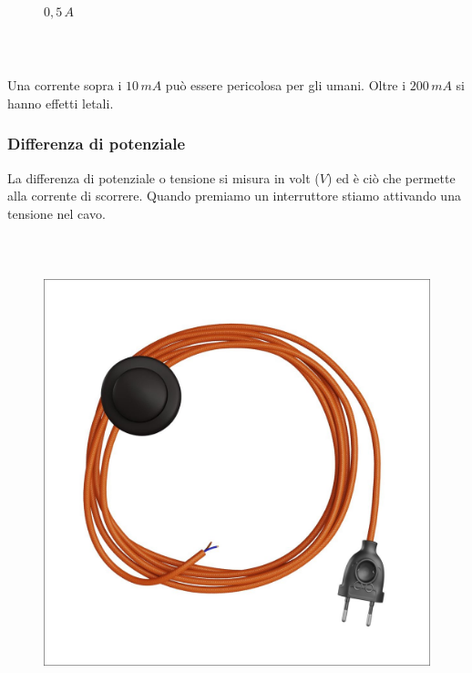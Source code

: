 \documentclass[handout]{beamer}
\theoremstyle{plain}
\begin{document}
\begin{frame}
\begin{columns}
\begin{column}{0.3\textwidth}
\begin{figure}
    $ 0,5 \, A$
  \end{figure}    
  \end{column}
\end{columns}

~

Una corrente sopra i $ 10 \, mA $ può essere pericolosa per gli umani. Oltre i $ 200 \, mA $ si hanno effetti letali.
\end{frame}



\begin{frame}
\frametitle{Differenza di potenziale}
La differenza di potenziale o tensione si misura in volt ($ V $) ed è ciò che permette alla corrente di scorrere. Quando premiamo un interruttore stiamo attivando una tensione nel cavo.

~

\begin{columns}
  \begin{column}{0.3\textwidth}
  \begin{figure}
    \includegraphics[width=\columnwidth]{img/cavo.jpg}


\end{figure}
\end{column}
\end{columns}
\end{frame}
\end{document}
